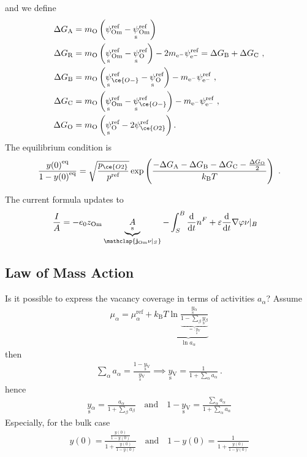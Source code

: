 \documentclass{article}
\numberwithin{equation}{section}
\newcommand{\us}[1]{\underset{\textrm{s}}{#1}{}}
\def\kB{k_\mathrm{B}}
\def\Ox{\mathrm{O}}
\newcommand{\Omin}{{\ce{O-}}}
\def\Om{\mathrm{Om}}
\newcommand{\OO}{{\ce{O2}}}
\newcommand{\dd}{{\mathrm{d}}}
\def\eM{\mathrm{e^-}}
\newcommand{\ysV}{\us y_{\textrm{V}}}
\def\y0{{y(0)}}
\def\DGA{\Delta G_\textrm{A}  }
\def\DGB{\Delta G_\textrm{B}  }
\def\DGC{\Delta G_\textrm{C}  }
\def\DGR{\Delta G_\textrm{R}  }
\def\DGO{\Delta G_\textrm{O}  }
\def\eq{\textrm{eq}}
\def\REF{\textrm{ref}}
\begin{document}
and we define
\begin{subequations}
\begin{align}
\DGA
&=
m_\Ox
\left(
	\psi_{\textrm{Om}}^\REF
	-
	\us \psi_{\textrm{Om}}^\REF
\right)
\\
\DGR
&= 
m_\Ox
\left(
	\us \psi_\Om^\REF
	-
	\us \psi_\Ox^\REF
\right)
-
2m_\eM \psi_\eM^\REF= \DGB + \DGC~,
\\\DGB
&= 
m_\Ox
\left(
	\us \psi_\Omin^\REF
	-
	\us \psi_\Ox^\REF
\right)
-
m_\eM \psi_\eM^\REF~,
\\
\DGC
&= 
m_\Ox
\left(
	\us \psi_\Om^\REF
	-
	\us \psi_\Omin^\REF
\right)
-
m_\eM \psi_\eM^\REF~,
\\
\DGO
&= 
m_\Ox
\left(
	\us \psi_{\Ox}^\REF
	-
	2 \psi_{\OO}^\REF
\right).
\end{align}
\end{subequations}
The equilibrium condition is
\begin{subequations}
\begin{align}
    \frac{\y0^\eq}{1-\y0^\eq} = \sqrt{\frac{p_\OO}{p^\REF}} \exp
\left(
	\frac{-\DGA - \DGB - \DGC - \frac{\DGO}{2}}{\kB T}
\right)~.
\end{align}
\end{subequations}

The current formula updates to
\begin{align}
    \frac{I}{A} &= - e_0  z_\Om \underbrace{\us A}_{\mathclap{\mathbf{j}_\Om\nu|_S}}
                     - \int_S^B \frac{\dd}{\dd t} n^F
                     +\varepsilon\frac{\dd}{\dd t}\nabla\varphi\nu|_B 
    \label{}
\end{align}
\subsection{Law of Mass Action}
Is it possible to express the vacancy coverage in terms of activities $a_\alpha$?
Assume
\begin{align}
    \mu_\alpha = \mu_\alpha^\REF + \kB T\underbrace{
      \ln \frac{\us y_\alpha}
               {\underbrace{1-\sum_\beta \us y_\beta}_{=:\ysV}}
    }_{\ln a_\alpha}
    \label{}
\end{align}
then
\begin{align}
    \sum_\alpha a_\alpha = \frac{1-\ysV}{\ysV} \implies \ysV = \frac{1}{1 + \sum_\alpha a_\alpha}~.
    \label{}
\end{align}
hence
\begin{align}
    \us y_\alpha = \frac{a_\alpha}{1+ \sum_\beta a_\beta}\quad\mbox{and}\quad 1-\ysV = \frac{\sum_\alpha a_\alpha}{1+ \sum_\alpha a_\alpha}
    \label{}
\end{align}
Especially, for the bulk case
\begin{align}
    y(0) = \frac{\frac{y(0)}{1-y(0)}}{1+\frac{y(0)}{1-y(0)}} \quad\mbox{and}\quad    1-y(0) = \frac{1}{1+\frac{y(0)}{1-y(0)}}
    \label{}
    \end{align}
\end{document}
